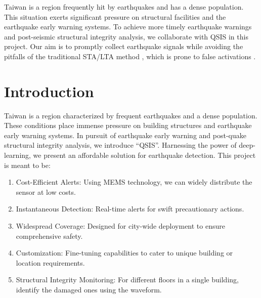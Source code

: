 \documentclass[a4paper,12pt, oneside]{article}
\begin{document}
Taiwan is a region frequently hit by earthquakes and has a dense population. This situation exerts significant pressure on structural facilities and the earthquake early warning systems. To achieve more timely earthquake warnings and post-seismic structural integrity analysis, we collaborate with QSIS in this project. Our aim is to promptly collect earthquake signals while avoiding the pitfalls of the traditional STA/LTA method \cite{app10082919}, which is prone to false activations \cite{10.1785/0220220322} \cite{10.1785/0120180080}.

\section{Introduction}
Taiwan is a region characterized by frequent earthquakes and a dense population. These conditions place immense pressure on building structures and earthquake early warning systems. In pursuit of earthquake early warning and post-quake structural integrity analysis, we introduce ``QSIS''. Harnessing the power of deep-learning, we present an affordable solution for earthquake detection. This project is meant to be:
\begin{enumerate} [label = \arabic*.]
	\item Cost-Efficient Alerts: Using MEMS technology, we can widely distribute the sensor at low costs.
	\item Instantaneous Detection: Real-time alerts for swift precautionary actions.
	\item Widespread Coverage: Designed for city-wide deployment to ensure comprehensive safety.
	\item Customization: Fine-tuning capabilities to cater to unique building or location requirements.
	\item Structural Integrity Monitoring: For different floors in a single building, identify the damaged ones using the waveform.
\end{enumerate}
%
\end{document}
